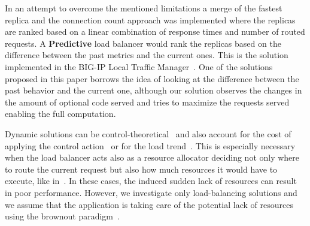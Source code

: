 In an attempt to overcome the mentioned limitations a merge of the
fastest replica and the connection count approach was implemented
where the replicas are ranked based on a linear combination of
response times and number of routed requests. A \textbf{Predictive}
load balancer would rank the replicas based on the difference between
the past metrics and the current ones. This is the solution
implemented in the BIG-IP Local Traffic Manager~\cite{BIGIP}. One of
the solutions proposed in this paper borrows the idea of looking at
the difference between the past behavior and the current one, although
our solution observes the changes in the amount of optional code
served and tries to maximize the requests served enabling the full
computation.

Dynamic solutions can be
control-theoretical~\cite{multipathctlb,comparisonstaticdynamic} and
also account for the cost of applying the control
action~\cite{costofcontrol} or for the load trend~\cite{CasolariSA}.
This is especially necessary when the load balancer acts also as a
resource allocator deciding not only where to route the current
request but also how much resources it would have to execute, 
like in~\cite{Ardagnaalltogether}. In these cases, the induced 
sudden lack of resources can result in poor performance. However, we 
investigate only load-balancing solutions and we assume that the 
application is taking care of the potential lack of resources using 
the brownout paradigm~\cite{cloudish-tr}.

